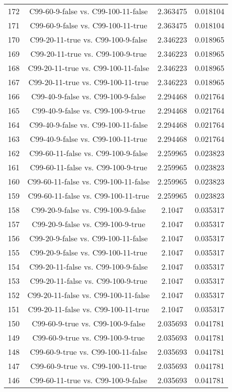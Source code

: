 \documentclass[a4paper,10pt]{article}
\begin{document}
\begin{landscape}
\begin{table}[!htp]
\begin{tabular}{cccc}
172&C99-60-9-false vs. C99-100-11-false&2.363475&0.018104\\
171&C99-60-9-false vs. C99-100-11-true&2.363475&0.018104\\
170&C99-20-11-true vs. C99-100-9-false&2.346223&0.018965\\
169&C99-20-11-true vs. C99-100-9-true&2.346223&0.018965\\
168&C99-20-11-true vs. C99-100-11-false&2.346223&0.018965\\
167&C99-20-11-true vs. C99-100-11-true&2.346223&0.018965\\
166&C99-40-9-false vs. C99-100-9-false&2.294468&0.021764\\
165&C99-40-9-false vs. C99-100-9-true&2.294468&0.021764\\
164&C99-40-9-false vs. C99-100-11-false&2.294468&0.021764\\
163&C99-40-9-false vs. C99-100-11-true&2.294468&0.021764\\
162&C99-60-11-false vs. C99-100-9-false&2.259965&0.023823\\
161&C99-60-11-false vs. C99-100-9-true&2.259965&0.023823\\
160&C99-60-11-false vs. C99-100-11-false&2.259965&0.023823\\
159&C99-60-11-false vs. C99-100-11-true&2.259965&0.023823\\
158&C99-20-9-false vs. C99-100-9-false&2.1047&0.035317\\
157&C99-20-9-false vs. C99-100-9-true&2.1047&0.035317\\
156&C99-20-9-false vs. C99-100-11-false&2.1047&0.035317\\
155&C99-20-9-false vs. C99-100-11-true&2.1047&0.035317\\
154&C99-20-11-false vs. C99-100-9-false&2.1047&0.035317\\
153&C99-20-11-false vs. C99-100-9-true&2.1047&0.035317\\
152&C99-20-11-false vs. C99-100-11-false&2.1047&0.035317\\
151&C99-20-11-false vs. C99-100-11-true&2.1047&0.035317\\
150&C99-60-9-true vs. C99-100-9-false&2.035693&0.041781\\
149&C99-60-9-true vs. C99-100-9-true&2.035693&0.041781\\
148&C99-60-9-true vs. C99-100-11-false&2.035693&0.041781\\
147&C99-60-9-true vs. C99-100-11-true&2.035693&0.041781\\
146&C99-60-11-true vs. C99-100-9-false&2.035693&0.041781\\

\end{tabular}
\end{table}
\end{landscape}
\end{document}
